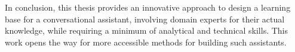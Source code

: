 \begin{ThesisAbstract}
\begin{EnglishAbstract}
		In conclusion, this thesis provides an innovative approach to design a learning base for a conversational assistant, involving domain experts for their actual knowledge, while requiring a minimum of analytical and technical skills.
		This work opens the way for more accessible methods for building such assistants.
		
	\end{EnglishAbstract}

\end{ThesisAbstract}